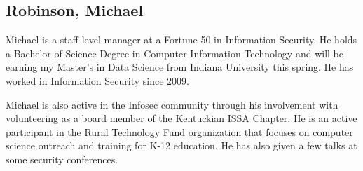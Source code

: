 \subsection{Robinson, Michael}

Michael is a staff-level manager at a Fortune 50 in Information
Security. He holds a Bachelor of Science Degree in Computer
Information Technology and will be earning my Master's in Data Science
from Indiana University this spring. He has worked in Information
Security since 2009.

Michael is also active in the Infosec community through his
involvement with volunteering as a board member of the Kentuckian ISSA
Chapter. He is an active participant in the Rural Technology Fund
organization that focuses on computer science outreach and training
for K-12 education. He has also given a few talks at some security
conferences.
